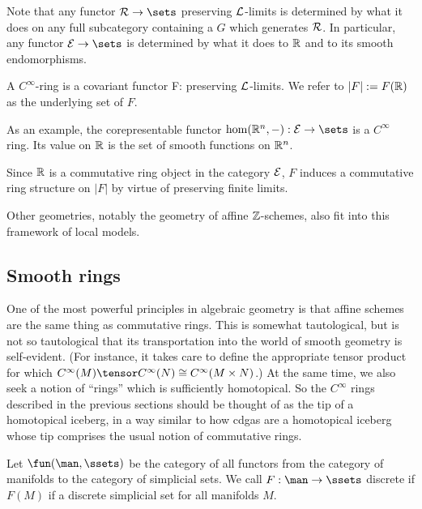 Note that any functor $\cR \to \sets$ preserving $\mathcal L$-limits is determined by what it does on any full subcategory containing a $G$ which generates $\mathcal R$. In particular, any functor $\cE \to \sets$ is determined by what it does to $\mathbb R$ and to its smooth endomorphisms.

\begin{defn}
A $C^\infty$-ring is a covariant functor
	\eqnn
	F: \cE \to \sets
	\eqnd
preserving $\mathcal L$-limits. We refer to $|F| := F(\mathbb R)$ as the underlying set of $F$. 
\end{defn}

As an example, the corepresentable functor $\hom( \RR^n, -) : \cE \to \sets$ is a $C^\infty$ ring. Its value on $\mathbb R$ is the set of smooth functions on $\mathbb R^n$.

\begin{remark}
Since $\mathbb R$ is a commutative ring object in the category $\mathcal E$, $F$ induces a commutative ring structure on $|F|$ by virtue of preserving finite limits.
\end{remark}

\begin{remark}
Other geometries, notably the geometry of affine $\mathbb Z$-schemes, also fit into this framework of local models.
\end{remark}


\subsection{Smooth rings}
One of the most powerful principles in algebraic geometry is that affine schemes are the same thing as commutative rings. This is somewhat tautological, but is not so tautological that its transportation into the world of smooth geometry is self-evident. (For instance, it takes care to define the appropriate tensor product for which $C^\infty(M) \tensor C^\infty (N) \cong C^\infty( M \times N)$.) At the same time, we also seek a notion of ``rings'' which is sufficiently homotopical. So the $C^\infty$ rings described in the previous sections should be thought of as the tip of a homotopical iceberg, in a way similar to how cdgas are a homotopical iceberg whose tip comprises the usual notion of commutative rings. 

Let $\fun(\man,\ssets)$ be the category of all functors from the category of manifolds to the category of simplicial sets. We call $F: \man \to \ssets$ discrete if $F(M)$ if a discrete simplicial set for all manifolds $M$.

